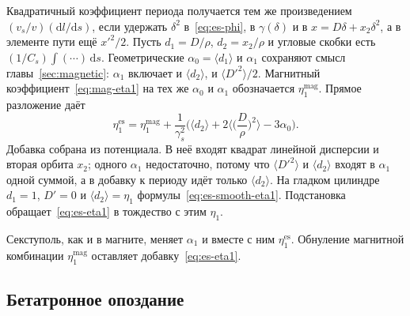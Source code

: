 Квадратичный коэффициент периода получается тем же произведением $(v_s/v)(\mathrm{d}l/\mathrm{d}s)$, если удержать $\delta^2$ в~\eqref{eq:es-phi}, в $\gamma(\delta)$ и в $x=D\delta+x_2\delta^2$, а в элементе пути ещё $x'^2/2$. Пусть $d_1=D/\rho$, $d_2=x_2/\rho$ и угловые скобки есть $(1/C_s)\int(\cdots)\,\mathrm{d}s$. Геометрические $\alpha_0=\langle d_1\rangle$ и $\alpha_1$ сохраняют смысл главы~\ref{sec:magnetic}: $\alpha_1$ включает и $\langle d_2\rangle$, и $\langle D'^2\rangle/2$. Магнитный коэффициент~\eqref{eq:mag-eta1} на тех же $\alpha_0$ и $\alpha_1$ обозначается $\eta_1^{\mathrm{mag}}$. Прямое разложение даёт
\begin{equation}
\label{eq:es-eta1}
\eta_1^{\mathrm{es}}
=\eta_1^{\mathrm{mag}}
+\frac{1}{\gamma_s^2}
\Biggl(
\langle d_2\rangle
+2\Biggl\langle\Biggl(\frac{D}{\rho}\Biggr)^2\Biggr\rangle
-3\alpha_0
\Biggr).
\end{equation}
Добавка собрана из потенциала. В неё входят квадрат линейной дисперсии и вторая орбита $x_2$; одного $\alpha_1$ недостаточно, потому что $\langle D'^2\rangle$ и $\langle d_2\rangle$ входят в $\alpha_1$ одной суммой, а в добавку к периоду идёт только $\langle d_2\rangle$. На гладком цилиндре $d_1=1$, $D'=0$ и $\langle d_2\rangle=\eta_1$ формулы~\eqref{eq:es-smooth-eta1}. Подстановка обращает~\eqref{eq:es-eta1} в тождество с этим $\eta_1$.

Секступоль, как и в магните, меняет $\alpha_1$ и вместе с ним $\eta_1^{\mathrm{es}}$. Обнуление магнитной комбинации $\eta_1^{\mathrm{mag}}$ оставляет добавку~\eqref{eq:es-eta1}.

\subsection{Бетатронное опоздание}
\label{sec:es-lambda}

